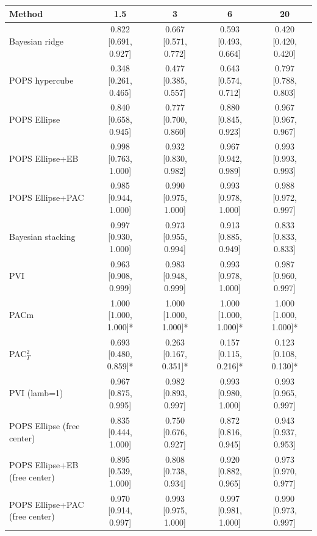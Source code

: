 \begin{tabular}{lcccc}
\toprule
Method & 1.5 & 3 & 6 & 20 \\
\midrule
Bayesian ridge & 0.822 {\scriptsize[0.691, 0.927]} & 0.667 {\scriptsize[0.571, 0.772]} & 0.593 {\scriptsize[0.493, 0.664]} & 0.420 {\scriptsize[0.420, 0.420]} \\
POPS hypercube & 0.348 {\scriptsize[0.261, 0.465]} & 0.477 {\scriptsize[0.385, 0.557]} & 0.643 {\scriptsize[0.574, 0.712]} & 0.797 {\scriptsize[0.788, 0.803]} \\
POPS Ellipse & 0.840 {\scriptsize[0.658, 0.945]} & 0.777 {\scriptsize[0.700, 0.860]} & 0.880 {\scriptsize[0.845, 0.923]} & 0.967 {\scriptsize[0.967, 0.967]} \\
POPS Ellipse+EB & 0.998 {\scriptsize[0.763, 1.000]} & 0.932 {\scriptsize[0.830, 0.982]} & 0.967 {\scriptsize[0.942, 0.989]} & 0.993 {\scriptsize[0.993, 0.993]} \\
POPS Ellipse+PAC & 0.985 {\scriptsize[0.944, 1.000]} & 0.990 {\scriptsize[0.975, 1.000]} & 0.993 {\scriptsize[0.978, 1.000]} & 0.988 {\scriptsize[0.972, 0.997]} \\
Bayesian stacking & 0.997 {\scriptsize[0.930, 1.000]} & 0.973 {\scriptsize[0.955, 0.994]} & 0.913 {\scriptsize[0.885, 0.949]} & 0.833 {\scriptsize[0.833, 0.833]} \\
PVI & 0.963 {\scriptsize[0.908, 0.999]} & 0.983 {\scriptsize[0.948, 0.999]} & 0.993 {\scriptsize[0.978, 1.000]} & 0.987 {\scriptsize[0.960, 0.997]} \\
PACm & 1.000 {\scriptsize[1.000, 1.000]}* & 1.000 {\scriptsize[1.000, 1.000]}* & 1.000 {\scriptsize[1.000, 1.000]}* & 1.000 {\scriptsize[1.000, 1.000]}* \\
PAC$^2_T$ & 0.693 {\scriptsize[0.480, 0.859]}* & 0.263 {\scriptsize[0.167, 0.351]}* & 0.157 {\scriptsize[0.115, 0.216]}* & 0.123 {\scriptsize[0.108, 0.130]}* \\
PVI (lamb=1) & 0.967 {\scriptsize[0.875, 0.995]} & 0.982 {\scriptsize[0.893, 0.997]} & 0.993 {\scriptsize[0.980, 1.000]} & 0.993 {\scriptsize[0.965, 0.997]} \\
POPS Ellipse (free center) & 0.835 {\scriptsize[0.444, 1.000]} & 0.750 {\scriptsize[0.676, 0.927]} & 0.872 {\scriptsize[0.816, 0.945]} & 0.943 {\scriptsize[0.937, 0.953]} \\
POPS Ellipse+EB (free center) & 0.895 {\scriptsize[0.539, 1.000]} & 0.808 {\scriptsize[0.738, 0.934]} & 0.920 {\scriptsize[0.882, 0.965]} & 0.973 {\scriptsize[0.970, 0.977]} \\
POPS Ellipse+PAC (free center) & 0.970 {\scriptsize[0.914, 0.997]} & 0.993 {\scriptsize[0.975, 1.000]} & 0.997 {\scriptsize[0.981, 1.000]} & 0.990 {\scriptsize[0.973, 0.997]} \\
\bottomrule
\end{tabular}

